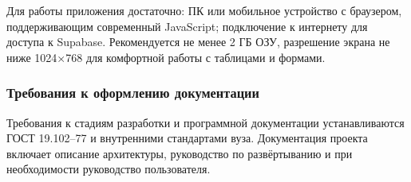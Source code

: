 Для работы приложения достаточно: ПК или мобильное устройство с браузером, поддерживающим современный JavaScript; подключение к интернету для доступа к Supabase. Рекомендуется не менее 2 ГБ ОЗУ, разрешение экрана не ниже 1024×768 для комфортной работы с таблицами и формами.

\subsubsection{Требования к оформлению документации}

Требования к стадиям разработки и программной документации устанавливаются ГОСТ 19.102–77 и внутренними стандартами вуза. Документация проекта включает описание архитектуры, руководство по развёртыванию и при необходимости руководство пользователя.
